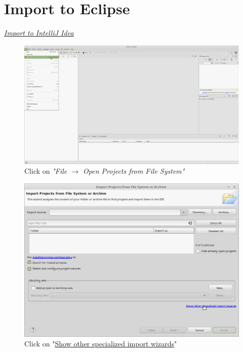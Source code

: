 \section{Import to Eclipse}
\textit{\hyperref[sec:imp_idea]{Import to IntelliJ Idea}}

\begin{figure}[H]
	\includegraphics[width=\textwidth]{setup-parts/pictures/eclipse-import-1.png}
	\caption{Click on \textit{"File $\rightarrow$ Open Projects from File System"}}
\end{figure}
\begin{figure}[H]
	\includegraphics[width=\textwidth]{setup-parts/pictures/eclipse-import-2.png}
	\caption{Click on "\underline{Show other specialized import wizards}"}
\end{figure}
